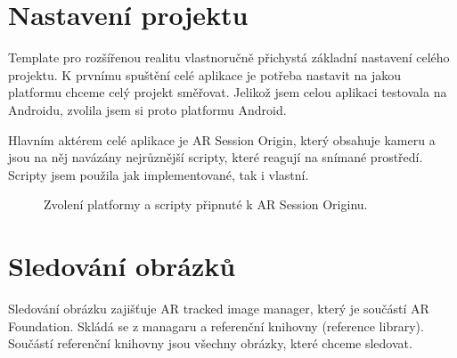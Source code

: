 \documentclass[12pt, a4paper,
twoside,        %
openright
]{report}
\begin{document}
\section{Nastavení projektu}
\label{sec:nastaveni_projektu}
Template pro rozšířenou realitu vlastnoručně přichystá základní nastavení celého projektu. K prvnímu spuštění celé aplikace je potřeba nastavit na jakou platformu chceme celý projekt směřovat. Jelikož jsem celou aplikaci testovala na Androidu, zvolila jsem si proto platformu Android. 

Hlavním aktérem celé aplikace je AR Session Origin, který obsahuje kameru a jsou na něj navázány nejrůznější scripty, které reagují na snímané prostředí. Scripty jsem použila jak implementované, tak i vlastní.

\begin{figure}
	\centering
	\qquad
	\caption{Zvolení platformy a scripty připnuté k AR Session Originu.}
	\label{fig:nastaveni_unity}
\end{figure}




\section {Sledování obrázků}
\label{sec:sledovani_obrazku}
 Sledování obrázku zajišťuje AR tracked image manager, který je součástí AR Foundation. Skládá se z managaru a referenční knihovny (reference library). Součástí referenční knihovny jsou všechny obrázky, které chceme sledovat.
 
\end{document}
